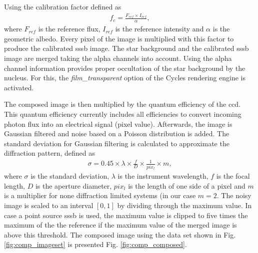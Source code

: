 Using the calibration factor defined as
\begin{align}
    f_c = \frac{F_{ref} \times I_{ref}}{\alpha}, \label{eq:comp_cal_fac}
\end{align}
where $F_{ref}$ is the reference flux, $I_{ref}$ is the reference intensity and $\alpha$ is the geometric albedo. Every pixel of the image is multiplied with this factor to produce the calibrated \gls{sssb} image. The star background and the calibrated \gls{sssb} image are merged taking the alpha channels into account. Using the alpha channel information provides proper occultation of the star background by the nucleus. For this, the \textit{film\_transparent} option of the Cycles rendering engine is activated.

The composed image is then multiplied by the quantum efficiency of the \gls{ccd}. This quantum efficiency currently includes all efficiencies to convert incoming photon flux into an electrical signal (pixel value). Afterwards, the image is Gaussian filtered and noise based on a Poisson distribution is added. The standard deviation for Gaussian filtering is calculated to approximate the diffraction pattern, defined as
\begin{align}
    \sigma = 0.45 \times \lambda \times \frac{f}{D}\times \frac{1}{pix_l} \times m, \label{eq:comp_sigma}
\end{align}
where $\sigma$ is the standard deviation, $\lambda$ is the instrument wavelength, $f$ is the focal length, $D$ is the aperture diameter, $pix_l$ is the length of one side of a pixel and $m$ is a multiplier for none diffraction limited systems (in our case $m = 2$. The noisy image is scaled to an interval $[0,1]$ by dividing through the maximum value. In case a point source \gls{sssb} is used, the maximum value is clipped to five times the maximum of the the reference if the maximum value of the merged image is above this threshold. The composed image using the data set shown in Fig. \ref{fig:comp_imageset} is presented Fig. \ref{fig:comp_composed}.

